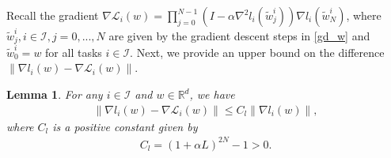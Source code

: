 \documentclass{osudissert96}
\newtheorem{lemma}{Lemma}
\begin{document}
Recall the gradient { $\nabla \mathcal{L}_i(w) = \prod_{j=0}^{N-1}(I-\alpha \nabla^2 l_i(\widetilde w^i_{j}))\nabla l_i( \widetilde w^i _{N})$}, where {  $ \widetilde w_{j}^i, i\in \mathcal{I}, j=0,..., N$} are given by the gradient descent steps in \cref{gd_w} and $\widetilde w_{0}^i = w$ for all tasks $i \in \mathcal{I}$.  
Next, we provide an upper bound on the difference { $\|\nabla l_i(w) - \nabla \mathcal{L}_i(w)\|$}.
\begin{lemma}\label{le:fF}
	For any $i \in\mathcal{I}$ and $w \in \mathbb{R}^d$, we have 
	\begin{align*}
	\|\nabla l_i(w) - \nabla \mathcal{L}_i(w)\| \leq C_l \|\nabla l_i(w)\|,
	\end{align*}
	where $C_l$ is a positive constant given by 
	\begin{align}\label{eq:cfn}
	C_l = (1+\alpha L)^{2N} - 1 > 0.
	\end{align}
\end{lemma}
\end{document}
